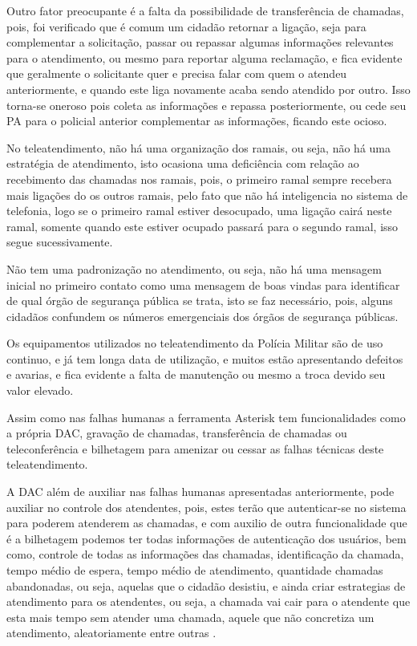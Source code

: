 Outro fator preocupante é a falta da possibilidade de transferência de chamadas, pois, foi verificado que é comum um cidadão retornar a ligação, seja para complementar a solicitação, passar ou repassar algumas informações relevantes para o atendimento, ou mesmo para reportar alguma reclamação, e fica evidente que geralmente o solicitante quer e precisa falar com quem o atendeu anteriormente, e quando este liga novamente acaba sendo atendido por outro. Isso torna-se oneroso pois coleta as informações e repassa posteriormente, ou cede seu PA para o policial anterior complementar as informações, ficando este ocioso.

No teleatendimento, não há uma organização dos ramais, ou seja, não há uma estratégia de atendimento, isto ocasiona uma deficiência com relação ao recebimento das chamadas nos ramais, pois, o primeiro ramal sempre recebera mais ligações do os outros ramais, pelo fato que não há inteligencia no sistema de telefonia, logo se o primeiro ramal estiver desocupado, uma ligação cairá neste ramal, somente quando este estiver ocupado passará para o segundo ramal, isso segue sucessivamente.

Não tem uma padronização no atendimento, ou seja, não há uma mensagem inicial no primeiro contato como uma mensagem de boas vindas para identificar de qual órgão de segurança pública se trata, isto se faz necessário, pois, alguns cidadãos confundem os números emergenciais dos órgãos de segurança públicas.

Os equipamentos utilizados no teleatendimento da Polícia Militar são de uso continuo, e já tem longa data de utilização, e muitos estão apresentando defeitos e avarias, e fica evidente a falta de manutenção ou mesmo a troca devido seu valor elevado.

Assim como nas falhas humanas a ferramenta Asterisk tem funcionalidades como a própria DAC, gravação de chamadas, transferência de chamadas ou teleconferência e bilhetagem para amenizar ou cessar as falhas técnicas deste teleatendimento.

A DAC além de auxiliar nas falhas humanas apresentadas anteriormente, pode auxiliar no controle dos atendentes, pois, estes terão que autenticar-se no sistema para poderem atenderem as chamadas, e com auxilio de outra funcionalidade que é a bilhetagem podemos ter todas informações de autenticação dos usuários, bem como, controle de todas as informações das chamadas, identificação da chamada, tempo médio de espera, tempo médio de atendimento, quantidade chamadas abandonadas, ou seja, aquelas que o cidadão desistiu, e ainda criar estrategias de atendimento para os atendentes, ou seja, a chamada vai cair para o atendente que esta mais tempo sem atender uma chamada, aquele que não concretiza um atendimento, aleatoriamente entre outras \cite{books/daglib/0018909}.

